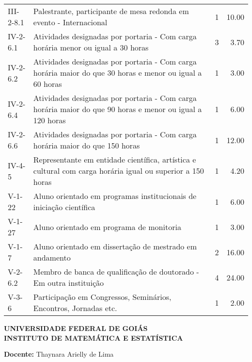 \documentclass[11pt,a4paper]{article}
\begin{document}
\begin{table}[ht]
\begin{tabular}{|l|p{12cm}|r|r|}
  III-2-8.1 & Palestrante, participante de mesa redonda em evento - Internacional &   1 & 10.00 \\ 
  IV-2-6.1 & Atividades designadas por portaria - Com carga horária menor ou igual a 30 horas &   3 & 3.70 \\ 
  IV-2-6.2 & Atividades designadas por portaria - Com carga horária maior do que 30 horas e menor ou igual a 60 horas &   1 & 3.00 \\ 
  IV-2-6.4 & Atividades designadas por portaria - Com carga horária maior do que 90 horas e menor ou igual a 120 horas &   1 & 6.00 \\ 
  IV-2-6.6 & Atividades designadas por portaria - Com carga horária maior do que 150 horas &   1 & 12.00 \\ 
  IV-4-5 & Representante em entidade científica, artística e cultural com carga horária igual ou superior a 150 horas &   1 & 4.20 \\ 
  V-1-22 & Aluno orientado em programas institucionais de iniciação científica &   1 & 6.00 \\ 
  V-1-27 & Aluno orientado em programa de monitoria &   1 & 3.00 \\ 
  V-1-7 & Aluno orientado em dissertação de mestrado em andamento &   2 & 16.00 \\ 
  V-2-6.2 & Membro de banca de qualificação de doutorado - Em outra instituição &   4 & 24.00 \\ 
  V-3-6 & Participação em Congressos, Seminários, Encontros, Jornadas etc. &   1 & 2.00 \\ 
   \hline
\end{tabular}
\end{table}


\newpage
\thispagestyle{empty}

\begin{center}
  \textbf{UNIVERSIDADE FEDERAL DE GOIÁS\\
  INSTITUTO DE MATEMÁTICA E ESTATÍSTICA}
\end{center}

\noindent\textbf{Docente:}
Thaynara Arielly de Lima
\end{document}
